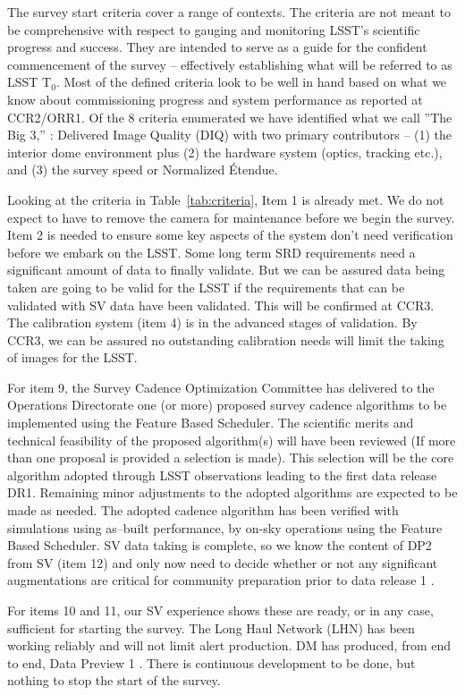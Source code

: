 The survey start criteria cover a range of contexts.  The criteria are not meant to be comprehensive with respect to gauging and monitoring LSST's scientific progress and success. They are intended to serve as a guide for the confident commencement of the survey -- effectively establishing what will be referred to as LSST T$_0$.  Most of the defined criteria look to be well in hand based on what we know about commissioning progress and system performance as reported at CCR2/ORR1.  Of the 8 criteria enumerated we have identified what we call ''The Big 3,'' : Delivered Image Quality (DIQ) with two primary contributors -- (1) the interior dome environment plus (2) the hardware system (optics, tracking etc.), and (3) the survey speed or Normalized \'{E}tendue. 

Looking at the criteria in Table~\ref{tab:criteria}, Item 1 is already met. We do not expect to have to remove the camera for maintenance before we begin the survey. Item 2 is needed to ensure some key aspects of the system don't need verification before we embark on the LSST. Some long term SRD requirements need a significant amount of data to finally validate. But we can be assured data being taken are going to be valid for the LSST if the requirements that can be validated with SV data have been validated. This will be confirmed at CCR3. The calibration system (item 4)  is in the advanced stages of validation. By CCR3, we can be assured no outstanding calibration needs will limit the taking of images for the LSST. 

For item 9, the Survey Cadence Optimization Committee has delivered to the Operations Directorate one (or more) proposed survey cadence algorithms to be implemented using the Feature Based Scheduler.  The scientific merits and technical feasibility of the proposed algorithm(s) will have been reviewed (If more than one proposal is provided a selection is made).  This selection will be the core algorithm adopted through LSST observations leading to the first data release DR1.  Remaining minor adjustments to the adopted algorithms are expected to be made as needed.  The adopted cadence algorithm has been verified with simulations using as--built performance, by on-sky operations using the Feature Based Scheduler.  SV data taking is complete, so we know the content of DP2 from SV (item 12) and only now need to decide whether or not any significant augmentations are critical for community preparation prior to data release 1 \citep[DR1; see][]{RTN-011}. 

For items 10 and 11, our SV experience shows these are ready, or in any case, sufficient for starting the survey. The Long Haul Network (LHN) has been working reliably and will not limit alert production. DM has produced, from end to end, Data Preview 1 \citep[DP1; see][]{RTN-095}. There is continuous development to be done, but nothing to stop the start of the survey.  

